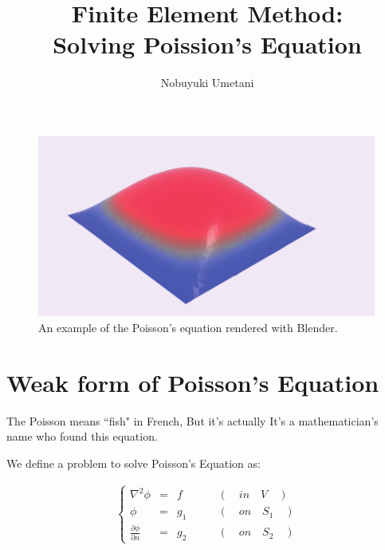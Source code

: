 


\title{Finite Element Method: \\Solving Poission's Equation}
\author{Nobuyuki Umetani}


\maketitle


\begin{figure}[htbp!]
\includegraphics[width=150mm]{images/teaser}
\caption{An example of the Poisson's equation rendered with Blender. }
\end{figure}

\tableofcontents

\section{Weak form of Poisson's Equation}



The Poisson means ``fish" in French, But it's actually It's a mathematician's name who found this equation.

We define a problem to solve Poisson's Equation as:

\begin{tcolorbox}[title=problem setting]
\begin{eqnarray}
\left\{
\begin{array}{rlll}
\nabla^2 \phi &=& f \qquad & ( \quad in \quad V \quad ) \\
\phi               &=& g_1 \qquad & (\quad on \quad S_1 \quad) \\
\frac{\partial \phi}{\partial n } &=& g_2 \qquad & (\quad on \quad S_2 \quad)
\end{array}
\right.
\end{eqnarray}
\end{tcolorbox}


